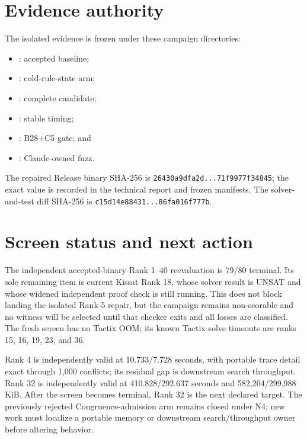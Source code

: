 \documentclass[11pt]{article}
\newcommand{\code}[1]{\texttt{#1}}
\begin{document}
\section{Evidence authority}

The isolated evidence is frozen under these campaign directories:

\begin{itemize}
  \item {}: accepted baseline;
  \item {}: cold-rule-state arm;
  \item {}: complete candidate;
  \item {}: stable timing;
  \item {}: B28+C5 gate; and
  \item {}: Claude-owned fuzz.
\end{itemize}

The repaired Release binary SHA-256 is
\code{26430a9dfa2d...71f9977f34845}; the exact value is recorded in the
technical report and frozen manifests.  The solver-and-test diff SHA-256 is
\code{c15d14e88431...86fa016f777b}.

\section{Screen status and next action}

The independent accepted-binary Rank 1--40 reevaluation is 79/80 terminal.
Its sole remaining item is current Kissat Rank 18, whose solver result is
UNSAT and whose widened independent proof check is still running.  This does
not block landing the isolated Rank-5 repair, but the campaign remains
non-scorable and no witness will be selected until that checker exits and all
losses are classified.  The fresh screen has no Tactix OOM; its known Tactix
solve timeouts are ranks 15, 16, 19, 23, and 36.

Rank 4 is independently valid at 10.733/7.728 seconds, with portable trace
detail exact through 1,000 conflicts; its residual gap is downstream search
throughput.  Rank 32 is independently valid at 410.828/292.637 seconds and
582,204/299,988 KiB.  After the screen becomes terminal, Rank 32 is the next
declared target.  The previously rejected Congruence-admission arm remains
closed under N4; new work must localize a portable memory or downstream
search/throughput owner before altering behavior.
\end{document}
